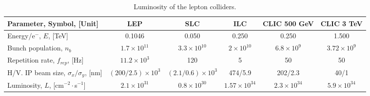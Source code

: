 \begin{table}[h]
{\scriptsize
\centering
\begin{tabular}{l||c|c|c|c|c}\hline
Parameter, Symbol, [Unit] & LEP & SLC & ILC & CLIC 500 GeV& CLIC 3 TeV\\\hline\hline
Energy/e$^-$, $E$, [TeV] &0.1046&0.050& 0.250 & 0.250 & 1.500\\
Bunch population, $n_b$ &$1.7\times10^{11}$&$3.3\times10^{10}$&$2\times10^{10}$&$6.8\times10^9$&$3.72\times10^9$\\
Repetition rate, $f_{rep}$, [Hz] &$11.2\times10^3$&120&5&50&50\\
H/V. IP beam size, $\sigma_x/\sigma_y$, [nm]&$(200/2.5)\times10^3$&$(2.1/0.6)\times10^3$&474/5.9&202/2.3&40/1\\\hline
Luminosity, $L$, [cm$^{-2}\cdot$s$^{-1}$]&$2.1\times10^{31}$&$0.8\times10^{30}$&$1.57\times10^{34}$& $2.3\times10^{34}$&$5.9\times10^{34}$\\\hline
\end{tabular}\caption{Luminosity of the lepton colliders.}\label{t:lum_rad}
}
\end{table}
